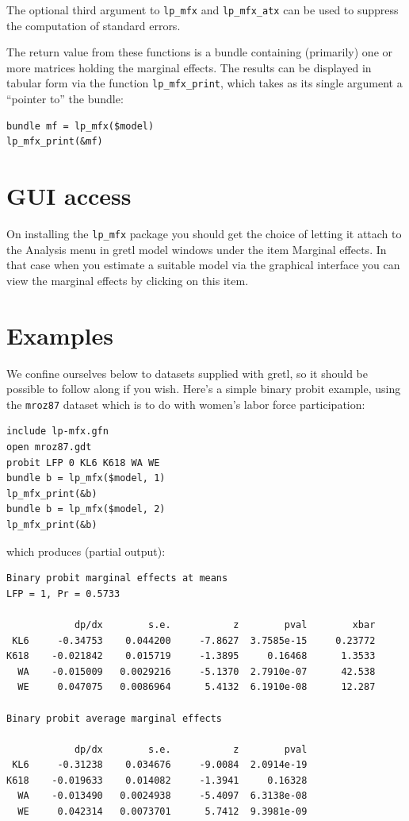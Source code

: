 \documentclass{article}
\begin{document}
The optional third argument to \texttt{lp\_mfx} and
\texttt{lp\_mfx\_atx} can be used to suppress the computation of
standard errors.

The return value from these functions is a bundle containing
(primarily) one or more matrices holding the marginal effects. The
results can be displayed in tabular form via the function
\texttt{lp\_mfx\_print}, which takes as its single argument a
``pointer to'' the bundle:
\begin{verbatim}
bundle mf = lp_mfx($model)
lp_mfx_print(&mf)
\end{verbatim}

\section{GUI access}
\label{sec:gui}

On installing the \texttt{lp\_mfx} package you should get the choice
of letting it attach to the \textsf{Analysis} menu in gretl model
windows under the item \textsf{Marginal effects}. In that case when you
estimate a suitable model via the graphical interface you can view the
marginal effects by clicking on this item.

\section{Examples}
\label{sec:examples}

We confine ourselves below to datasets supplied with gretl, so it
should be possible to follow along if you wish.  Here's a simple
binary probit example, using the \texttt{mroz87} dataset which is to
do with women's labor force participation:

{\small
\begin{verbatim}
include lp-mfx.gfn
open mroz87.gdt
probit LFP 0 KL6 K618 WA WE
bundle b = lp_mfx($model, 1)
lp_mfx_print(&b)
bundle b = lp_mfx($model, 2)
lp_mfx_print(&b)
\end{verbatim}
}
which produces (partial output):
{\small
\begin{verbatim}
Binary probit marginal effects at means
LFP = 1, Pr = 0.5733

            dp/dx        s.e.           z        pval        xbar
 KL6     -0.34753    0.044200     -7.8627  3.7585e-15     0.23772
K618    -0.021842    0.015719     -1.3895     0.16468      1.3533
  WA    -0.015009   0.0029216     -5.1370  2.7910e-07      42.538
  WE     0.047075   0.0086964      5.4132  6.1910e-08      12.287

Binary probit average marginal effects

            dp/dx        s.e.           z        pval
 KL6     -0.31238    0.034676     -9.0084  2.0914e-19
K618    -0.019633    0.014082     -1.3941     0.16328
  WA    -0.013490   0.0024938     -5.4097  6.3138e-08
  WE     0.042314   0.0073701      5.7412  9.3981e-09
\end{verbatim}
}
\end{document}
